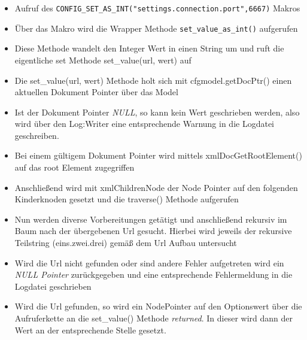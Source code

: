 \begin{itemize}

    \item Aufruf des \verb+CONFIG_SET_AS_INT("settings.connection.port",6667)+ Makros
    \item Über das Makro wird die Wrapper Methode \verb+set_value_as_int()+ aufgerufen
    \item Diese Methode wandelt den Integer Wert in einen String um und ruft die eigentliche set Methode set\_value(url, wert) auf
    \item Die set\_value(url, wert) Methode holt sich mit cfgmodel.getDocPtr() einen aktuellen Dokument Pointer über das Model
    \item Ist der Dokument Pointer \emph{NULL}, so kann kein Wert geschrieben werden, also wird über den Log:Writer
        eine entsprechende Warnung in die Logdatei geschreiben.
    \item Bei einem gültigem Dokument Pointer wird  mittels xmlDocGetRootElement() auf das root Element zugegriffen
    \item Anschließend wird mit xmlChildrenNode der Node Pointer auf den folgenden Kinderknoden gesetzt und die traverse() Methode aufgerufen
    \item Nun werden diverse Vorbereitungen getätigt und anschließend rekursiv im Baum nach der übergebenen
        Url gesucht. Hierbei wird jeweils der rekursive Teilstring (eins.zwei.drei) gemäß dem Url Aufbau untersucht

    \item Wird die Url nicht gefunden oder sind andere Fehler aufgetreten wird ein \emph{NULL Pointer} zurückgegeben und eine entsprechende Fehlermeldung in die Logdatei geschrieben
    \item Wird die Url gefunden, so wird ein NodePointer auf den Optionswert über die Aufruferkette an die set\_value() Methode \emph{returned}. In dieser wird dann der Wert an der entsprechende Stelle gesetzt.  
\end{itemize}
